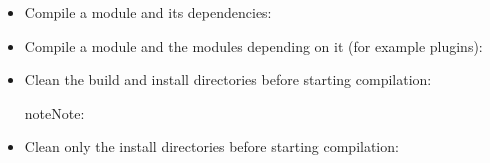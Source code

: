 \documentclass[a4paper,10pt,english]{sphinxmanual}
\begin{document}
\begin{itemize}
\item {} 
Compile a module and its dependencies:

%
\begin{sphinxVerbatim}[commandchars=\\\{\}]
     
\end{sphinxVerbatim}

\item {} 
Compile a module and the modules depending on it (for example plugins):

%
\begin{sphinxVerbatim}[commandchars=\\\{\}]
     
\end{sphinxVerbatim}

\item {} 
Clean the build and install directories before starting compilation:

%
\begin{sphinxVerbatim}[commandchars=\\\{\}]
      
\end{sphinxVerbatim}

\begin{sphinxadmonition}{note}{Note:}
\end{sphinxadmonition}

\item {} 
Clean only the install directories before starting compilation:

%
\begin{sphinxVerbatim}[commandchars=\\\{\}]
   
\end{sphinxVerbatim}


\end{itemize}
\end{document}
